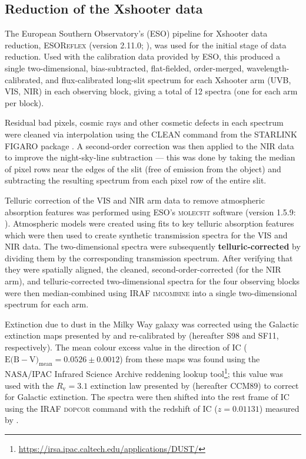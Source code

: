 \subsection{Reduction of the Xshooter data}
\label{section: xshooter_ic_5063: observations_and_data_reduction: data_reduction}

The European Southern Observatory's (ESO) pipeline for Xshooter data reduction, \textsc{ESOReflex} (version 2.11.0; \citealt{Freudling2013}), was used for the initial stage of data reduction. Used with the calibration data provided by ESO, this produced a single two-dimensional, bias-subtracted, flat-fielded, order-merged, wavelength-calibrated, and flux-calibrated long-slit spectrum for each Xshooter arm (UVB, VIS, NIR) in each observing block, giving a total of 12 spectra (one for each arm per block).

Residual bad pixels, cosmic rays and other cosmetic defects in each spectrum were cleaned via interpolation using the \textsc{CLEAN} command from the \textsc{STARLINK FIGARO} package \citep{Currie2014}. A second-order correction was then applied to the NIR data to improve the night-sky-line subtraction --- this was done by taking the median of pixel rows near the edges of the slit (free of emission from the object) and subtracting the resulting spectrum from each pixel row of the entire slit.

Telluric correction of the VIS and NIR arm data to remove atmospheric absorption features was performed using ESO's \textsc{molecfit} software (version 1.5.9: \citealt{Smette2015, Kausch2015}). Atmospheric models were created using fits to key telluric absorption features which were then used to create synthetic transmission spectra for the VIS and NIR data. The two-dimensional spectra were subsequently \textbf{telluric-corrected} by dividing them by the corresponding transmission spectrum. After verifying that they were spatially aligned, the cleaned, second-order-corrected (for the NIR arm), and telluric-corrected two-dimensional spectra for the four observing blocks were then median-combined using \textsc{IRAF} \textsc{imcombine} \citep{Tody1986, Tody1993} into a single two-dimensional spectrum for each arm.

Extinction due to dust in the Milky Way galaxy was corrected using the Galactic extinction maps presented by \citet{Schlegel1998} and re-calibrated by \citet{Schlafly2011} (hereafter S98 and SF11, respectively). The mean colour excess value in the direction of IC \mbox{($\mathrm{E(B}-\mathrm{V)}_\mathrm{mean} = 0.0526\pm0.0012$)} from these maps was found using the NASA/IPAC Infrared Science Archive reddening lookup tool\footnote{\url{https://irsa.ipac.caltech.edu/applications/DUST/}}; this value was used with the $R_\mathrm{v}=3.1$ extinction law presented by \citet{Cardelli1989} (hereafter CCM89) to correct for Galactic extinction. The spectra were then shifted into the rest frame of IC using the \textsc{IRAF} \textsc{dopcor} command with the redshift of IC ($z=0.01131$) measured by \citet{Tadhunter2014}.

